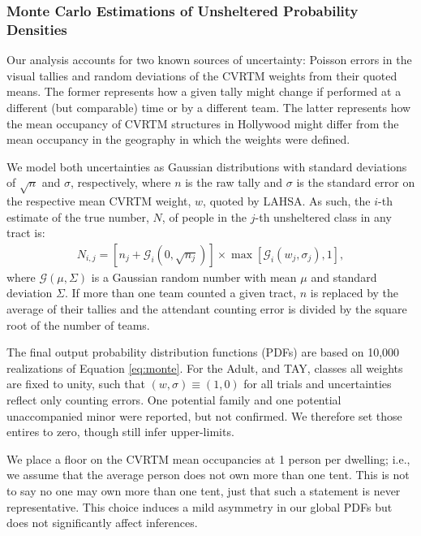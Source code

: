 \documentclass[11pt,twocolumn]{article}
\def\resp{respectively}
\begin{document}
\subsubsection{Monte Carlo Estimations of Unsheltered Probability Densities}
\label{sec:mc}

Our analysis accounts for two known sources of uncertainty: Poisson errors in the visual tallies and 
random deviations of the CVRTM weights from their quoted means. The former represents how a given 
tally might change if performed at a different (but comparable) time or by a different team. The latter 
represents how the mean occupancy of CVRTM structures in Hollywood might differ from the mean 
occupancy in the geography in which the weights were defined.

We model both uncertainties as Gaussian distributions with standard deviations of 
$\sqrt{n}$ and $\sigma$, \resp, where $n$ is the raw tally and $\sigma$ is the standard 
error on the respective mean CVRTM weight, $w$, quoted by LAHSA. As such, the $i$-th estimate 
of the true number, $N$, of people in the $j$-th unsheltered class in any tract is:
\begin{multline}\label{eq:monte}
	N_{i,j} = \left[n_{j} + \mathcal{G}_{i}(0,\sqrt{n_{j}})\right]\times\max[\mathcal{G}_{i}(w_{j}, \sigma_{j}),1],
\end{multline}
where $\mathcal{G}(\mu,\Sigma)$ is a Gaussian random number with mean $\mu$ and standard deviation 
$\Sigma$. If more than one team counted a given tract, $n$ is replaced by the average of their tallies 
and the attendant counting error is divided by the square root of the number of teams.

The final output probability distribution functions (PDFs) are based on 10,000 realizations of 
Equation \ref{eq:monte}. For the Adult, and TAY, classes all weights are fixed to unity, such that 
$(w,\sigma)\equiv(1,0)$ for all trials and uncertainties reflect only counting errors. One potential 
family and one potential unaccompanied minor were reported, but not confirmed. We therefore
set those entires to zero, though still infer upper-limits.

We place a floor on the CVRTM mean occupancies at 1 person per dwelling; i.e., we assume that the average
person does not own more than one tent. This is not to say no one may own more than one tent, just that
such a statement is never representative. This choice induces a mild asymmetry in our global PDFs but
does not significantly affect inferences.
\end{document}
